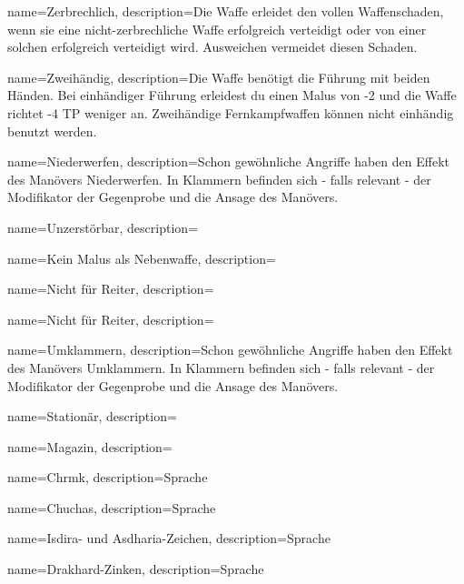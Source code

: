 {
    name={Zerbrechlich},
    description={Die Waffe erleidet den vollen Waffenschaden, wenn sie eine nicht-zerbrechliche Waffe erfolgreich verteidigt oder von einer solchen erfolgreich verteidigt wird. Ausweichen vermeidet diesen Schaden.}
}


{
    name={Zweihändig},
    description={Die Waffe benötigt die Führung mit beiden Händen. Bei einhändiger Führung erleidest du einen Malus von -2 und die Waffe richtet -4 TP weniger an. Zweihändige Fernkampfwaffen können nicht einhändig benutzt werden.}
}


{
    name={Niederwerfen},
    description={Schon gewöhnliche Angriffe haben den Effekt des Manövers Niederwerfen. In Klammern befinden sich - falls relevant - der Modifikator der Gegenprobe und die Ansage des Manövers.}
}


{
    name={Unzerstörbar},
    description={}
}


{
    name={Kein Malus als Nebenwaffe},
    description={}
}


{
    name={Nicht für Reiter},
    description={}
}


{
    name={Nicht für Reiter},
    description={}
}


{
    name={Umklammern},
    description={Schon gewöhnliche Angriffe haben den Effekt des Manövers Umklammern. In Klammern befinden sich - falls relevant - der Modifikator der Gegenprobe und die Ansage des Manövers.}
}


{
    name={Stationär},
    description={}
}


{
    name={Magazin},
    description={}
}


{
    name={Chrmk},
    description={Sprache}
}


{
    name={Chuchas},
    description={Sprache}
}


{
    name={Isdira- und Asdharia-Zeichen},
    description={Sprache}
}


{
    name={Drakhard-Zinken},
    description={Sprache}
}


